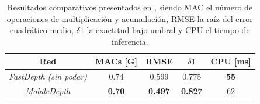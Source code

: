 \begin{itemize}
    \begin{table}[H]
    \centering
    \begin{tabular}{@{}ccccc@{}}
    \toprule
    Red                            & MACs {[}G{]}  & RMSE           & $\delta1$ & CPU {[}ms{]} \\ \midrule
    \textit{FastDepth (sin podar)} & 0.74          & 0.599          & 0.775                  & \textbf{55}  \\
    \textit{MobileDepth}           & \textbf{0.70} & \textbf{0.497} & \textbf{0.827}         & 62           \\ \bottomrule
    \end{tabular}
    \caption{Resultados comparativos presentados en \cite{wang2020mobiledepth}, siendo MAC el número de operaciones de multiplicación y acumulación, RMSE la raíz del error cuadrático medio, $\delta1$ la exactitud bajo umbral \cite{depth-estimation-metrics} y CPU el tiempo de inferencia.}
    \label{tab:comparacion-fastdepth-mobile-depth}
    \end{table}
    
\end{itemize}



\clearpage
